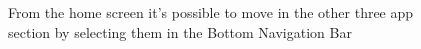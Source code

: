 \begin{figure}[H]
  \label{menu}
   \caption{From the home screen it's possible to move in the other three app section by selecting them in the Bottom Navigation Bar}
  \centering
   
\end{figure}



